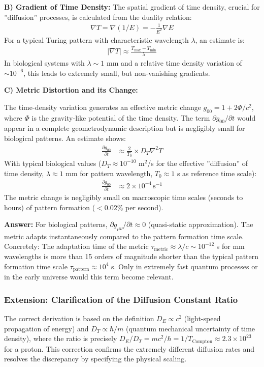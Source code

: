 	\textbf{B) Gradient of Time Density:}
	The spatial gradient of time density, crucial for ''diffusion'' processes, is calculated from the duality relation:
	\begin{align*}
		\nabla T = \nabla(1/E) = -\frac{1}{E^2} \nabla E
	\end{align*}
	For a typical Turing pattern with characteristic wavelength $\lambda$, an estimate is:
	\begin{align*}
		|\nabla T| \approx \frac{T_{\text{max}} - T_{\text{min}}}{\lambda}
	\end{align*}
	In biological systems with $\lambda \sim 1$ mm and a relative time density variation of $\sim 10^{-6}$, this leads to extremely small, but non-vanishing gradients.
	
	\textbf{C) Metric Distortion and its Change:}
	
	The time-density variation generates an effective metric change $g_{00} = 1 + 2\Phi/c^2$, where $\Phi$ is the gravity-like potential of the time density. The term $\partial g_{00}/\partial t$ would appear in a complete geometrodynamic description but is negligibly small for biological patterns. An estimate shows:
	\begin{align*}
		\frac{\partial g_{00}}{\partial t} &\approx \frac{2}{T_0} \times D_T \nabla^2 T
	\end{align*}
	With typical biological values ($D_T \approx 10^{-10}$ m$^2$/s for the effective ''diffusion'' of time density, $\lambda \approx 1$ mm for pattern wavelength, $T_0 \approx 1$ s as reference time scale):
	\begin{align*}
		\frac{\partial g_{00}}{\partial t} &\approx 2 \times 10^{-4} \, \text{s}^{-1}
	\end{align*}
	The metric change is negligibly small on macroscopic time scales (seconds to hours) of pattern formation ($< 0.02\%$ per second).
	
	\textbf{Answer:} For biological patterns, $\partial g_{\mu\nu}/\partial t \approx 0$ (quasi-static approximation). The metric adapts instantaneously compared to the pattern formation time scale. Concretely: The adaptation time of the metric $\tau_{\text{metric}} \approx \lambda/c \sim 10^{-12}$ s for mm wavelengths is more than 15 orders of magnitude shorter than the typical pattern formation time scale $\tau_{\text{pattern}} \approx 10^4$ s. Only in extremely fast quantum processes or in the early universe would this term become relevant.
	
	\subsubsection*{Extension: Clarification of the Diffusion Constant Ratio}
	The correct derivation is based on the definition $D_E \propto c^2$ (light-speed propagation of energy) and $D_T \propto \hbar / m$ (quantum mechanical uncertainty of time density), where the ratio is precisely $D_E / D_T = m c^2 / \hbar = 1 / T_{\text{Compton}} \approx 2.3 \times 10^{23}$ for a proton. This correction confirms the extremely different diffusion rates and resolves the discrepancy by specifying the physical scaling.
	
